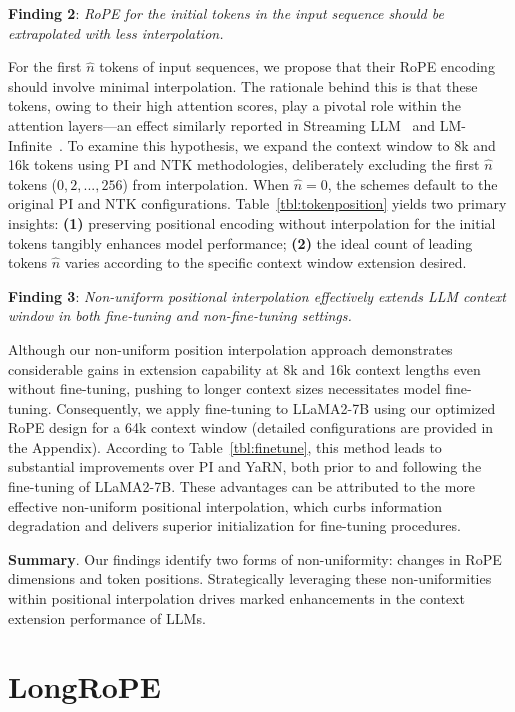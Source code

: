 \textbf{Finding 2}: \textit{RoPE for the initial tokens in the input sequence should be extrapolated with less interpolation.} 

For the first $\hat{n}$ tokens of input sequences, we propose that their RoPE encoding should involve minimal interpolation. The rationale behind this is that these tokens, owing to their high attention scores, play a pivotal role within the attention layers—an effect similarly reported in Streaming LLM~\cite{streamingllm} and LM-Infinite~\cite{han2023lminfinite}. To examine this hypothesis, we expand the context window to 8k and 16k tokens using PI and NTK methodologies, deliberately excluding the first $\hat n$ tokens ($0, 2, ..., 256$) from interpolation. When $\hat n=0$, the schemes default to the original PI and NTK configurations. Table~\ref{tbl:tokenposition} yields two primary insights: \textbf{(1)} preserving positional encoding without interpolation for the initial tokens tangibly enhances model performance; \textbf{(2)} the ideal count of leading tokens $\hat n$ varies according to the specific context window extension desired.

\textbf{Finding 3}: \textit{Non-uniform positional interpolation effectively extends LLM context window in both fine-tuning and non-fine-tuning settings.} 

Although our non-uniform position interpolation approach demonstrates considerable gains in extension capability at 8k and 16k context lengths even without fine-tuning, pushing to longer context sizes necessitates model fine-tuning. Consequently, we apply fine-tuning to LLaMA2-7B using our optimized RoPE design for a 64k context window (detailed configurations are provided in the Appendix). According to Table~\ref{tbl:finetune}, this method leads to substantial improvements over PI and YaRN, both prior to and following the fine-tuning of LLaMA2-7B. These advantages can be attributed to the more effective non-uniform positional interpolation, which curbs information degradation and delivers superior initialization for fine-tuning procedures.

\textbf{Summary}. Our findings identify two forms of non-uniformity: changes in RoPE dimensions and token positions. Strategically leveraging these non-uniformities within positional interpolation drives marked enhancements in the context extension performance of LLMs.

\section{LongRoPE}

